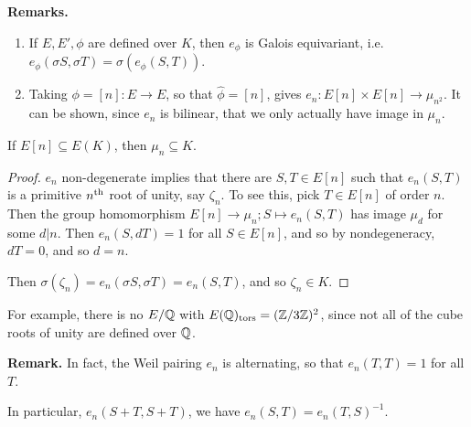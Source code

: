 \documentclass[10pt,a4paper]{article}
\begin{document}
\textbf{Remarks.}
\begin{enumerate}
  \item If $E,E', \phi$ are defined over $K$, then $e_\phi$ is Galois equivariant, i.e. $e_\phi(\sigma S, \sigma T) = \sigma(e_\phi(S,T))$.
  \item Taking $\phi = [n]:E \to E$, so that $\hat{\phi} = [n]$, gives $e_n:E[n]\times E[n] \to \mu_{n^2}$. It can be shown, since $e_n$ is bilinear, that we only actually have image in $\mu_n$.
\end{enumerate}
\begin{corollary}
  If $E[n]\subseteq E(K)$, then $\mu_n \subseteq K$.
\end{corollary}
\begin{proof}
  $e_n$ non-degenerate implies that there are $S,T \in E[n]$ such that $e_n(S,T)$ is a primitive $n\textsuperscript{th}$ root of unity, say $\zeta_n$. To see this, pick $T \in E[n]$ of order $n$. Then the group homomorphism $E[n] \to \mu_n; S \mapsto e_n(S,T)$ has image $\mu_d$ for some $d |n$. Then $e_n(S,dT) = 1$ for all $S \in E[n]$, and so by nondegeneracy, $dT = 0$, and so $d=n$.

  Then $\sigma(\zeta_n) = e_n(\sigma S, \sigma T)= e_n(S,T)$, and so $\zeta_n \in K$.
\end{proof}
For example, there is no $E/\mathbb{Q}$ with $E(\mathbb{Q})_\text{tors} = (\mathbb{Z}/3\mathbb{Z})^2$, since not all of the cube roots of unity are defined over $\mathbb{Q}$.

\textbf{Remark.} In fact, the Weil pairing $e_n$ is alternating, so that $e_n(T,T) = 1$ for all $T$.

In particular, $e_n(S+T,S+T)$, we have $e_n(S,T) = e_n(T,S)^{-1}$.
\end{document}
